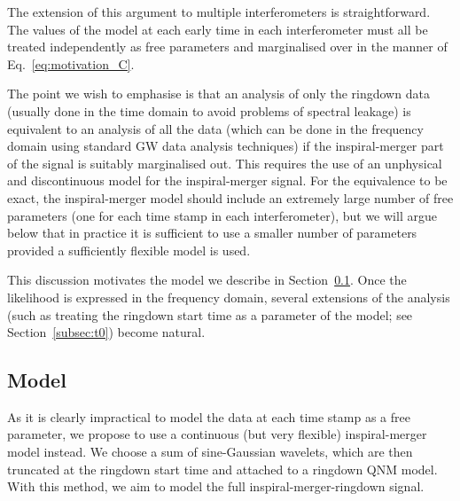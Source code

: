 The extension of this argument to multiple interferometers is straightforward. 
The values of the model at each early time in each interferometer must all be treated independently as free parameters and marginalised over in the manner of Eq.~\ref{eq:motivation_C}.

The point we wish to emphasise is that an analysis of only the ringdown data (usually done in the time domain to avoid problems of spectral leakage) is equivalent to an analysis of all the data (which can be done in the frequency domain using standard GW data analysis techniques) if the inspiral-merger part of the signal is suitably marginalised out. 
This requires the use of an unphysical and discontinuous model for the inspiral-merger signal.
For the equivalence to be exact, the inspiral-merger model should include an extremely large number of free parameters (one for each time stamp in each interferometer), but we will argue below that in practice it is sufficient to use a smaller number of parameters provided a sufficiently flexible model is used.

This discussion motivates the model we describe in Section~\ref{subsec:model}. Once the likelihood is expressed in the frequency domain, several extensions of the analysis (such as treating the ringdown start time as a parameter of the model; see Section~\ref{subsec:t0}) become natural.


\subsection{Model}\label{subsec:model}

As it is clearly impractical to model the data at each time stamp as a free parameter, we propose to use a continuous (but very flexible) inspiral-merger model instead. 
We choose a sum of sine-Gaussian wavelets, which are then truncated at the ringdown start time and attached to a ringdown QNM model. 
With this method, we aim to model the full inspiral-merger-ringdown signal.

